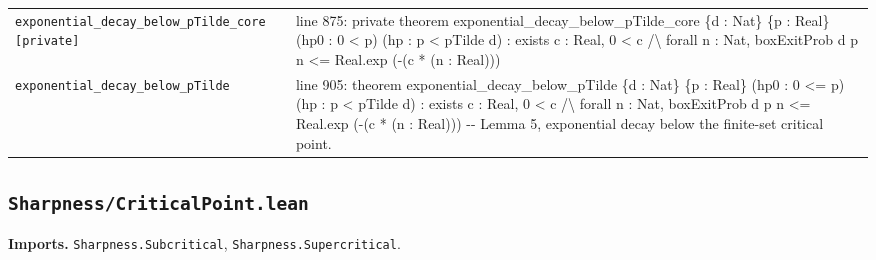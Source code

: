 \documentclass[10pt]{article}
\newcommand{\module}[1]{\texttt{#1}}
\begin{document}
\begin{longtable}{>{\raggedright\arraybackslash}p{} >{\raggedright\arraybackslash}p{}}
\texttt{exponential\_\allowbreak{}decay\_\allowbreak{}below\_\allowbreak{}pTilde\_\allowbreak{}core [private]} & {\ttfamily\scriptsize line 875:\allowbreak{} private theorem exponential\_\allowbreak{}decay\_\allowbreak{}below\_\allowbreak{}pTilde\_\allowbreak{}core \{d :\allowbreak{} Nat\} \{p :\allowbreak{} Real\} (\allowbreak{}hp0 :\allowbreak{} 0 < p)\allowbreak{} (\allowbreak{}hp :\allowbreak{} p < pTilde d)\allowbreak{} :\allowbreak{} exists c :\allowbreak{} Real,\allowbreak{} 0 < c /\allowbreak{}\textbackslash{} forall n :\allowbreak{} Nat,\allowbreak{} boxExitProb d p n <=\allowbreak{} Real.\allowbreak{}exp (\allowbreak{}-\allowbreak{}(\allowbreak{}c *\allowbreak{} (\allowbreak{}n :\allowbreak{} Real)\allowbreak{})\allowbreak{})\allowbreak{}} \\[0.45em]
\texttt{exponential\_\allowbreak{}decay\_\allowbreak{}below\_\allowbreak{}pTilde} & {\ttfamily\scriptsize line 905:\allowbreak{} theorem exponential\_\allowbreak{}decay\_\allowbreak{}below\_\allowbreak{}pTilde \{d :\allowbreak{} Nat\} \{p :\allowbreak{} Real\} (\allowbreak{}hp0 :\allowbreak{} 0 <=\allowbreak{} p)\allowbreak{} (\allowbreak{}hp :\allowbreak{} p < pTilde d)\allowbreak{} :\allowbreak{} exists c :\allowbreak{} Real,\allowbreak{} 0 < c /\allowbreak{}\textbackslash{} forall n :\allowbreak{} Nat,\allowbreak{} boxExitProb d p n <=\allowbreak{} Real.\allowbreak{}exp (\allowbreak{}-\allowbreak{}(\allowbreak{}c *\allowbreak{} (\allowbreak{}n :\allowbreak{} Real)\allowbreak{})\allowbreak{})\allowbreak{} -\allowbreak{}-\allowbreak{} Lemma 5,\allowbreak{} exponential decay below the finite-\allowbreak{}set critical point.\allowbreak{}} \\[0.45em]
\end{longtable}

\subsection*{\module{Sharpness/CriticalPoint.lean}}
\textbf{Imports.} \module{Sharpness.Subcritical}, \module{Sharpness.Supercritical}.
\end{document}
